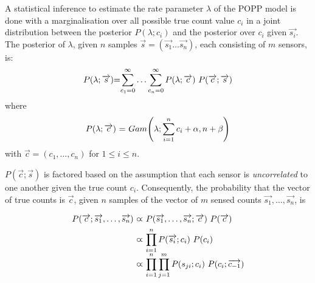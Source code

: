 A statistical inference to estimate the rate parameter $\lambda$ of the POPP model is done with a marginalisation over all possible true count value $c_i$ in a joint distribution between the posterior $P(\lambda ; c_i)$ and the posterior over $c_i$ given $\overrightarrow{s_i}$. The posterior of $\lambda$, given $n$ samples $\overrightarrow{s}=(\overrightarrow{s_1} \dots \overrightarrow{s_n})$, each consisting of $m$ sensors, is:
\begin{equation}
	\label{eq:marginal_occurrences}
	\begin{tabular}{r@{=}l}
		$P(\lambda ; \overrightarrow{s})$ &  $\displaystyle\sum_{c_1=0}^{\infty} \ldots \displaystyle\sum_{c_n=0}^{\infty} P(\lambda ; \overrightarrow{c}) ~ P(\overrightarrow{c} ; \overrightarrow{s})$ \\
	\end{tabular}
\end{equation}
\noindent where
\begin{equation*}
	\begin{tabular}{r@{ = }l}
		$P(\lambda ; \overrightarrow{c})$ & $Gam\Bigg(\lambda ; \displaystyle\sum_{i=1}^{n} c_i + \alpha, n + \beta \Bigg)$
	\end{tabular}
\end{equation*}
\noindent with $\overrightarrow{c} = (c_1, \ldots, c_n)$ for $1 \leq i \leq n$.

$P(\overrightarrow{c} ; \overrightarrow{s})$ is factored based on the assumption that each sensor is \textit{uncorrelated} to one another given the true count $c_i$. Consequently, the probability that the vector of true counts is $\overrightarrow{c}$, given $n$ samples of the vector of $m$ sensed counts $\overrightarrow{s_1}, \ldots, \overrightarrow{s_n}$, is

\begin{equation}
    \label{eq:occurrences_likelihood}
    \begin{tabular}{r@{ $\varpropto$ }l}
        $P(\overrightarrow{c} ; \overrightarrow{s_1}, \ldots, \overrightarrow{s_n})$ & $P(\overrightarrow{s_1}, \ldots, \overrightarrow{s_n} ; \overrightarrow{c}) ~ P(\overrightarrow{c})$ \\ [1ex]
        & $\displaystyle\prod_{i=1}^{n} P(\overrightarrow{s_i} ; c_i) ~ P(c_i)$ \\ [2ex]
        & $\displaystyle\prod_{i=1}^{n} \displaystyle\prod_{j=1}^{m} P(s_{ji} ; c_i) ~ P(c_i ; \overrightarrow{c_{-1}})$
    \end{tabular}
\end{equation}

